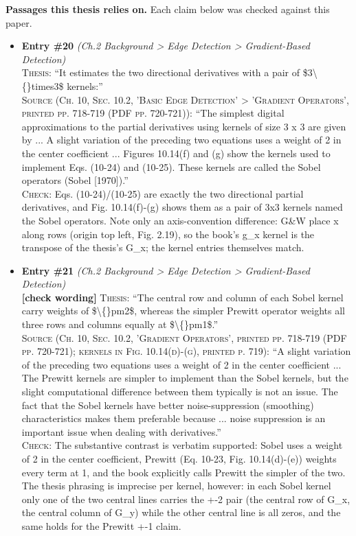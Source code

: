 \documentclass[11pt, a4paper]{article}
\begin{document}
\textbf{Passages this thesis relies on.} Each claim below was checked against this paper.
\begin{itemize}[leftmargin=1.2em,itemsep=4pt]
\item \textbf{Entry \#20} \textit{(Ch.2 Background > Edge Detection > Gradient-Based Detection)}\\
\textsc{Thesis:} ``It estimates the two directional derivatives with a pair of \$3\textbackslash\{\}times3\$ kernels:''\\
\textsc{Source (Ch. 10, Sec. 10.2, 'Basic Edge Detection' > 'Gradient Operators', printed pp. 718-719 (PDF pp. 720-721)):} ``The simplest digital approximations to the partial derivatives using kernels of size 3 x 3 are given by ... A slight variation of the preceding two equations uses a weight of 2 in the center coefficient ... Figures 10.14(f) and (g) show the kernels used to implement Eqs. (10-24) and (10-25). These kernels are called the Sobel operators (Sobel [1970]).''\\
\textsc{Check:} Eqs. (10-24)/(10-25) are exactly the two directional partial derivatives, and Fig. 10.14(f)-(g) shows them as a pair of 3x3 kernels named the Sobel operators. Note only an axis-convention difference: G\&W place x along rows (origin top left, Fig. 2.19), so the book's g\_x kernel is the transpose of the thesis's G\_x; the kernel entries themselves match.
\item \textbf{Entry \#21} \textit{(Ch.2 Background > Edge Detection > Gradient-Based Detection)}\\
\textcolor{partialorange}{\textbf{[check wording]}} \textsc{Thesis:} ``The central row and column of each Sobel kernel carry weights of \$\textbackslash\{\}pm2\$, whereas the simpler Prewitt operator weights all three rows and columns equally at \$\textbackslash\{\}pm1\$.''\\
\textsc{Source (Ch. 10, Sec. 10.2, 'Gradient Operators', printed pp. 718-719 (PDF pp. 720-721); kernels in Fig. 10.14(d)-(g), printed p. 719):} ``A slight variation of the preceding two equations uses a weight of 2 in the center coefficient ... The Prewitt kernels are simpler to implement than the Sobel kernels, but the slight computational difference between them typically is not an issue. The fact that the Sobel kernels have better noise-suppression (smoothing) characteristics makes them preferable because ... noise suppression is an important issue when dealing with derivatives.''\\
\textsc{Check:} The substantive contrast is verbatim supported: Sobel uses a weight of 2 in the center coefficient, Prewitt (Eq. 10-23, Fig. 10.14(d)-(e)) weights every term at 1, and the book explicitly calls Prewitt the simpler of the two. The thesis phrasing is imprecise per kernel, however: in each Sobel kernel only one of the two central lines carries the +-2 pair (the central row of G\_x, the central column of G\_y) while the other central line is all zeros, and the same holds for the Prewitt +-1 claim.

\end{itemize}
\end{document}

